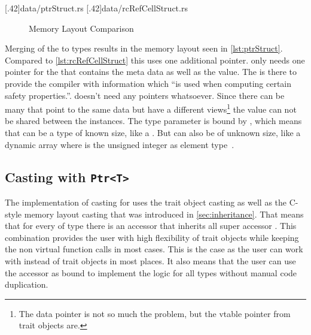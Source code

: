 \documentclass[thesis]{subfiles}
\begin{document}
    \LstTikzBox{\ptrStruct}[.42\linewidth]{data/ptrStruct.rs}
    \LstTikzBox{\rcRefCellStruct}[.42\linewidth]{data/rcRefCellStruct.rs}
    \begin{figure}[ht]
      \captionsetup{type=lstlisting}
      \hfill%
      \caption{Memory Layout Comparison}\label{lst:memoryLayout}
    \end{figure}

    Merging of the to types results in the memory layout seen in \autoref{lst:ptrStruct}.
    Compared to \autoref{lst:rcRefCellStruct} this uses one additional pointer.
    \RcT only needs one pointer for the  that contains the meta data as well as the value.
    The  is there to provide the compiler with information which \enquote{is used when computing certain safety properties.}\autocite[std::marker::PhantomData]{rust-doc}.
    \RefCellT doesn't need any pointers whatsoever.
    Since there can be many \PtrTs that point to the same data but have a different views\footnote{
      The data pointer is not so much the problem, but the vtable pointer from trait objects are.
    } the value can not be shared between the \PtrT instances.
    The type parameter \T is bound by , which means that \T can be a type of known size, like a \struct.
    But \T can also be of unknown size, like a dynamic array \codr{[usize]} where  is the unsigned integer as element type~\autocite[std::marker::Sized]{rust-doc}.

  \subsection{Casting with \texttt{Ptr<T>}}
    The implementation of casting for \PtrT uses the trait object casting as well as the C-style memory layout casting that was introduced in \autoref{sec:inheritance}.
    That means that for every \struct of type \T there is an accessor \trait that inherits all super accessor \traits.
    This combination provides the user with high flexibility of trait objects while keeping the non virtual function calls in most cases.
    This is the case as the user can work with \structs instead of trait objects in most places.
    It also means that the user can use the accessor \traits as bound to implement the logic for all types without manual code duplication.
\end{document}
